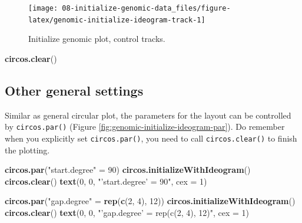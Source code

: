 \documentclass[]{book}
\newenvironment{Shaded}{\begin{snugshade}}{\end{snugshade}}
\newcommand{\KeywordTok}[1]{\textcolor[rgb]{0.13,0.29,0.53}{\textbf{#1}}}
\newcommand{\DataTypeTok}[1]{\textcolor[rgb]{0.13,0.29,0.53}{#1}}
\newcommand{\DecValTok}[1]{\textcolor[rgb]{0.00,0.00,0.81}{#1}}
\newcommand{\StringTok}[1]{\textcolor[rgb]{0.31,0.60,0.02}{#1}}
\newcommand{\NormalTok}[1]{#1}
\theoremstyle{definition}
\theoremstyle{definition}
\theoremstyle{remark}
\begin{document}
\begin{figure}

{\centering \texttt{[image: 08-initialize-genomic-data\_files/figure-latex/genomic-initialize-ideogram-track-1]} 

}

\caption{Initialize genomic plot, control tracks.}\label{fig:genomic-initialize-ideogram-track}
\end{figure}

\begin{Shaded}
\begin{Highlighting}[]
\KeywordTok{circos.clear}\NormalTok{()}
\end{Highlighting}
\end{Shaded}

\subsection{Other general settings}\label{other-general-settings}

Similar as general circular plot, the parameters for the layout can be
controlled by \texttt{circos.par()} (Figure
\ref{fig:genomic-initialize-ideogram-par}). Do remember when you
explicitly set \texttt{circos.par()}, you need to call
\texttt{circos.clear()} to finish the plotting.

\begin{Shaded}
\begin{Highlighting}[]
\KeywordTok{circos.par}\NormalTok{(}\StringTok{"start.degree"}\NormalTok{ =}\StringTok{ }\DecValTok{90}\NormalTok{)}
\KeywordTok{circos.initializeWithIdeogram}\NormalTok{()}
\KeywordTok{circos.clear}\NormalTok{()}
\KeywordTok{text}\NormalTok{(}\DecValTok{0}\NormalTok{, }\DecValTok{0}\NormalTok{, }\StringTok{"'start.degree' = 90"}\NormalTok{, }\DataTypeTok{cex =} \DecValTok{1}\NormalTok{)}

\KeywordTok{circos.par}\NormalTok{(}\StringTok{"gap.degree"}\NormalTok{ =}\StringTok{ }\KeywordTok{rep}\NormalTok{(}\KeywordTok{c}\NormalTok{(}\DecValTok{2}\NormalTok{, }\DecValTok{4}\NormalTok{), }\DecValTok{12}\NormalTok{))}
\KeywordTok{circos.initializeWithIdeogram}\NormalTok{()}
\KeywordTok{circos.clear}\NormalTok{()}
\KeywordTok{text}\NormalTok{(}\DecValTok{0}\NormalTok{, }\DecValTok{0}\NormalTok{, }\StringTok{"'gap.degree' = rep(c(2, 4), 12)"}\NormalTok{, }\DataTypeTok{cex =} \DecValTok{1}\NormalTok{)}
\end{Highlighting}
\end{Shaded}
\end{document}
